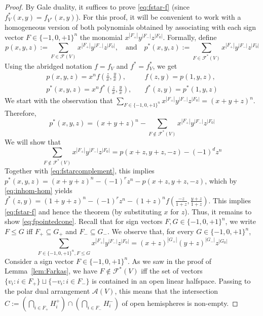 \documentclass[11pt]{article}
\newcommand{\arr}{\mathcal{A}}
\newcommand{\fhom}{p}
\renewcommand{\leq}{\leqslant}
\begin{document}
\begin{proof} By Gale duality, it suffices to prove \eqref{eq:fstar-f} (since $f^*_V(x,y)=f_{V^*}(x,y)$).
%
For this proof, it will be convenient to work with a homogeneous version of both polynomials obtained by associating with each sign vector $F\in \{-1,0,+1\}^n$ the monomial $x^{|F_+|}y^{|F_-|}z^{|F_0|}$. Formally, 
define
\[
\fhom(x,y,z):=\sum_{F\in \mathcal{F}(V)} x^{|F_+|}y^{|F_-|}z^{|F_0|}, \quad \textrm{and}\quad 
\fhom^*(x,y,z):=\sum_{F\in \mathcal{F}^*(V)} x^{|F_+|}y^{|F_-|}z^{|F_0|} 
\]
Using the abridged notation $f=f_V$ and $f^*=f^*_V$, 
we get 
\begin{equation}
\label{eq:inhom-hom}
\begin{split}
\textstyle \fhom(x,y,z) = x^n f(\frac{z}{x}, \frac{y}{x}),\quad &f(z,y)=\fhom(1,y,z), \\
\textstyle \fhom^*(x,y,z) = x^n f^*(\frac{z}{x},\frac{y}{x}),\quad &f^*(z,y)=\fhom^*(1,y,z)
\end{split}
\end{equation}
We start with the observation that $\sum_{F\in \{-1,0,+1\}^n} x^{|F_+|} y^{|F_-|} z^{|F_0|}= (x+y+z)^n$. Therefore, 
\begin{equation}
\label{eq:fstarcomplement}
\fhom^*(x,y,z) =(x+y+z)^n - \sum_{F \not\in \mathcal{F}^*(V)} x^{|F_+|} y^{|F_-|} z^{|F_0|}
\end{equation}
We will show that
\begin{equation}
\label{eq:fpointedcone}
\sum_{F \not\in \mathcal{F}^*(V)} x^{|F_+|} y^{|F_-|} z^{|F_0|} = p(x+z,y+z,-z) -(-1)^d z^n
\end{equation}
Together with \eqref{eq:fstarcomplement}, this implies $\fhom^*(x,y,z) = (x+y+z)^n -(-1)^rz^n - \fhom(x+z,y+z,-z)$, which by \eqref{eq:inhom-hom} yields $f^*(z,y)=(1+y+z)^n -(-1)^r z^n - (1+z)^n f(\frac{-z}{1+z},\frac{y+z}{1+z})$. This implies \eqref{eq:fstar-f} and hence the theorem (by substituting $x$ for $z$). Thus, it remains to show \eqref{eq:fpointedcone}.
%
Recall that for sign vectors $F,G \in \{-1,0,+1\}^n$, we write $F\leq G$ iff $F_+ \subseteq G_+$ and $F_- \subseteq G_-$. 
We observe that, for every $G \in \{-1,0,+1\}^n$,
\begin{equation}
\label{eq:superfaces}
\sum_{F\in \{-1,0,+1\}^n, F\leq G} x^{|F_+|} y^{|F_-|} z^{|F_0|}=(x+z)^{|G_+|} (y+z)^{|G_-|}z^{|G_0|}
\end{equation}
Consider a sign vector $F\in \{-1,0,+1\}^n$. As we saw in the proof of Lemma~\ref{lem:Farkas}, we have $F\not \in \mathcal{F}^*(V)$ iff the set of vectors $\{v_i \colon i\in F_+\} \sqcup \{-v_i \colon i\in F_-\}$ is contained in an open linear halfspace. Passing to the polar dual arrangement $\arr(V)$, this means that the intersection  $C:=(\bigcap_{i \in F_+} H_i^+) \cap (\bigcap_{i \in F_-} H_i^-)$ of open hemispheres is non-empty.

\end{proof}
\end{document}
